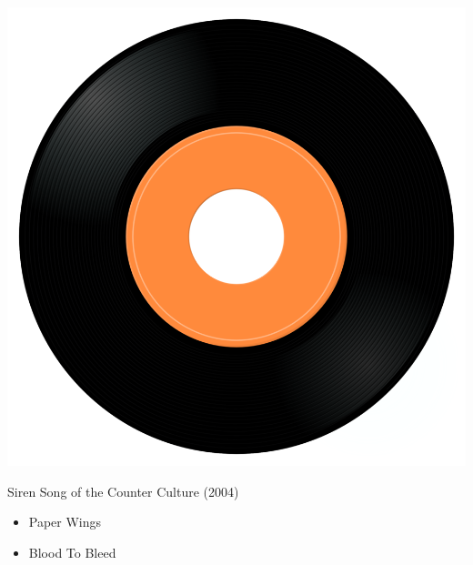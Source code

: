\begin{minipage}[t]{0.25\textwidth}
\captionsetup{type=figure}
\includegraphics[width=\textwidth]{Images/cover.png}
\caption*{Siren Song of the Counter Culture (2004)}
\end{minipage}
\begin{minipage}[t]{0.25\textwidth}\vspace{0pt}
\begin{itemize}[nosep,leftmargin=1em,labelwidth=*,align=left]
	\setlength{\itemsep}{0pt}
	\item Paper Wings
	\item Blood To Bleed
\end{itemize}
\end{minipage}
